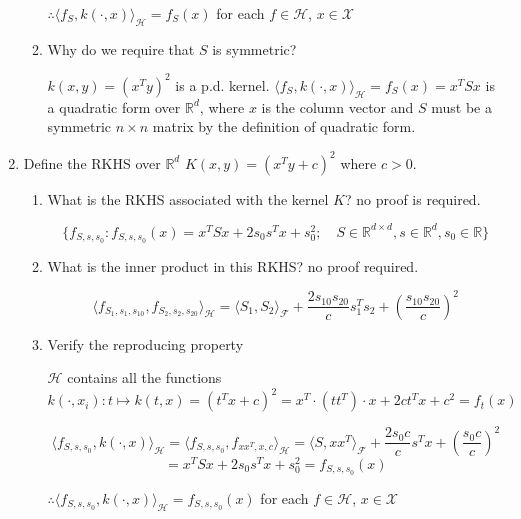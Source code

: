 \documentclass[11pt]{article}
\DeclareMathOperator{\trace}{trace}
\begin{document}
\begin{enumerate}
\begin{enumerate}
$\therefore\langle f_{S},k(\cdot,x)\rangle_{\mathcal{H}}=f_{S}(x)$ for each $f\in\mathcal{H}$, $x\in\mathcal{X}$


\item Why do we require that $S$ is symmetric?

$k(x,y)=(x^Ty)^2$ is a p.d. kernel. $\langle f_{S},k(\cdot,x)\rangle_{\mathcal{H}}= f_{S}(x)=x^TS x$ is a quadratic form over $\mathbb{R}^d$, where $x$ is the column vector and $S$ must be a symmetric $n\times n$ matrix by the definition of quadratic form.






\end{enumerate}

\item Define the RKHS  over $\mathbb{R}^d$ $K(x,y)=(x^Ty+c)^2$ where $c>0$. 

\begin{enumerate}
\item What is the RKHS associated with the kernel $K$? no proof is required. 

$$\{f_{S,s,s_0}: f_{S,s,s_{0}}(x)=x^T S x+2s_0 s^Tx+s_0^2;\quad S\in\mathbb{R}^{d\times d},s\in\mathbb{R}^{d},s_0\in\mathbb{R}\}$$


\item What is the inner product in this RKHS? no proof required.  


$$\langle f_{S_1,s_1,s_{10}},f_{S_2,s_2,s_{20}}\rangle_{\mathcal{H}}=\langle S_1,S_2\rangle_{\mathcal{F}}+\frac{2s_{10}s_{20}}cs_1^Ts_2+(\frac{s_{10}s_{20}}c)^2$$

\item Verify the reproducing property

$\mathcal{H}$ contains all the functions 
$k(\cdot,x_i): t\mapsto k(t,x)=(t^Tx+c)^2=x^T\cdot (tt^T)\cdot x+2ct^Tx+c^2=f_t(x)$


$$\langle f_{S,s,s_{0}},k(\cdot,x)\rangle_{\mathcal{H}}=\langle f_{S,s,s_{0}},f_{xx^T,x,c}\rangle_{\mathcal{H}}=\langle S,xx^T\rangle_{\mathcal{F}}+\frac{2s_{0}c}cs^Tx+(\frac{s_{0}c}c)^2$$
$$=x^T Sx+2s_{0}s^Tx+s_0^2= f_{S,s,s_{0}}(x)$$

$\therefore\langle f_{S,s,s_{0}},k(\cdot,x)\rangle_{\mathcal{H}}=f_{S,s,s_{0}}(x)$ for each $f\in\mathcal{H}$, $x\in\mathcal{X}$

\end{enumerate}

\end{enumerate}
\end{document}

